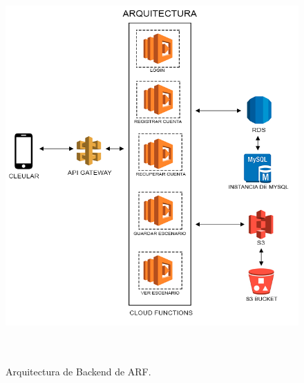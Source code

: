 \begin{figure}[h!]
	\centering
	\includegraphics[width=15cm,height=15cm]{imagenes/desarrollo/arquitectura/ArchitecturaBackend.png}
	\caption{Arquitectura de Backend de ARF.}
	\label{fig:arqbackend}
\end{figure}



